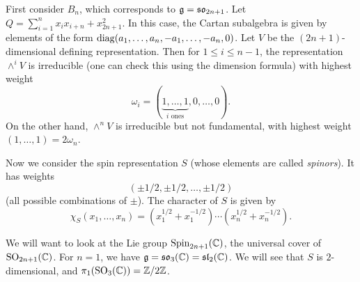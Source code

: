 \begin{remark}
  First consider $B_n$, which
  corresponds to $\mathfrak{g} = \mathfrak{so}_{2n + 1}$.
  Let $Q = \sum_{i = 1}^n x_i x_{i + n} + x^2_{2n + 1}$.
  In this case, the
  Cartan subalgebra is given
  by elements of the form
  $\operatorname{diag}(a_1, \dots, a_n, -a_1, \dots, -a_n, 0)$.
  Let $V$ be the $(2n + 1)$-dimensional
  defining representation. Then
  for $1 \le i \le n - 1$, the
  representation $\wedge^i V$
  is irreducible (one can check this
  using the dimension formula) with
  highest weight
  \[
    \omega_i
    = (\underbrace{1, \dots, 1}_{i \text{ ones}}, 0, \dots, 0).
  \]
  On the other hand, $\wedge^n V$ is
  irreducible but not fundamental,
  with highest weight
  $(1, \dots, 1) = 2\omega_n$.

  Now we consider the spin
  representation $S$ (whose elements
  are called \emph{spinors}).
  It has weights
  \[
    (\pm 1 / 2, \pm 1 / 2, \dots, \pm 1 / 2)
  \]
  (all possible combinations of
  $\pm$). The character of $S$ is
  given by
  \[
    \chi_S(x_1, \dots, x_n)
    = (x_1^{1 / 2} + x_1^{-1 / 2})
    \cdots (x_n^{1 / 2} + x_n^{-1 / 2}).
  \]
\end{remark}

\begin{remark}
  We will want to look
  at the Lie group
  $\mathrm{Spin}_{2n + 1}(\mathbb{C})$,
  the universal cover of
  $\operatorname{SO}_{2n + 1}(\mathbb{C})$. For
  $n = 1$, we have
  $\mathfrak{g} = \mathfrak{so}_3(\mathbb{C}) = \mathfrak{sl}_2(\mathbb{C})$.
  We will see that $S$ is
  $2$-dimensional, and
  $\pi_1(\operatorname{SO}_3(\mathbb{C})) = \mathbb{Z} / 2\mathbb{Z}$.
\end{remark}
